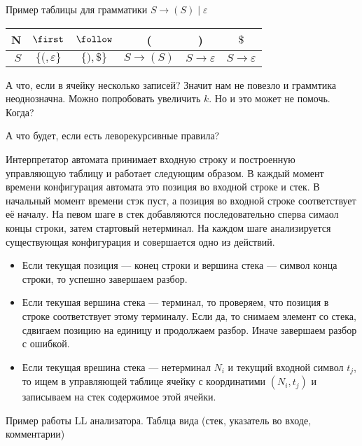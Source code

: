 \begin{example}

Пример таблицы для грамматики $S \to ( S ) \mid \varepsilon$

\begin{center}
\begin{tabular}{ r || c | c || c | c | c }
N & $\first$ & $\follow$ & ( & ) & $\$ $ \\ \hline
$S$ & $\{ (, \varepsilon \}$ & $\{ ), \$ \}$ & $S \rightarrow (S)$ & $S \rightarrow \varepsilon$ & $S \rightarrow \varepsilon$
\end{tabular}
\end{center}

\end{example}

А что, если в ячейку несколько записей? Значит нам не повезло и граммтика неоднозначна. Можно попробовать увеличить $k$. Но и это может не помочь. Когда?

А что будет, если есть леворекурсивные правила?

Интерпретатор автомата принимает входную строку и построенную управляющую таблицу и работает следующим образом.
В каждый момент времени конфигурация автомата это позиция во входной строке и стек.
В начальный момент времени стэк пуст, а позиция во входной строке соответствует её началу.
На певом шаге в стек добавляются последовательно сперва симаол концы строки, затем стартовый нетерминал.
На каждом шаге анализируется существующая конфигурация и совершается одно из действий.
\begin{itemize}
\item Если текущая позиция --- конец строки и вершина стека --- символ конца строки, то успешно завершаем разбор.
\item Если текушая вершина стека --- терминал, то проверяем, что позиция в строке соответствует этому терминалу. Если да, то снимаем элемент со стека, сдвигаем позицию на единицу и продолжаем разбор. Иначе завершаем разбор с ошибкой.
\item Если текущая врешина стека --- нетерминал $N_i$ и текущий входной символ $t_j$, то ищем в управляющей таблице ячейку с координатими $(N_i, t_j)$ и записываем на стек содержимое этой ячейки.
\end{itemize}

\begin{example}Пример работы LL анализатора.
  Таблца вида (стек, указатель во входе, комментарии)
\end{example}

